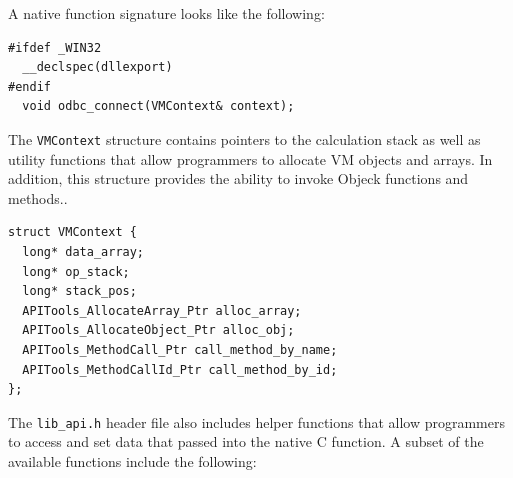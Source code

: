 \documentclass[11pt]{article}
\begin{document}
A native function signature looks like the following:
\begin{verbatim}
#ifdef _WIN32
  __declspec(dllexport)
#endif
  void odbc_connect(VMContext& context);
\end{verbatim}

The \texttt{VMContext} structure contains pointers to the calculation
stack as well as utility functions that allow programmers to allocate
VM objects and arrays.  In addition, this structure provides the
ability to invoke Objeck functions and methods..

\begin{verbatim}
struct VMContext {
  long* data_array;
  long* op_stack;
  long* stack_pos;
  APITools_AllocateArray_Ptr alloc_array;
  APITools_AllocateObject_Ptr alloc_obj;
  APITools_MethodCall_Ptr call_method_by_name;
  APITools_MethodCallId_Ptr call_method_by_id;
};
\end{verbatim}

The \texttt{lib\_api.h} header file also includes helper functions
that allow programmers to access and set data that passed into the
native C function.  A subset of the available functions include the
following:
\end{document}
